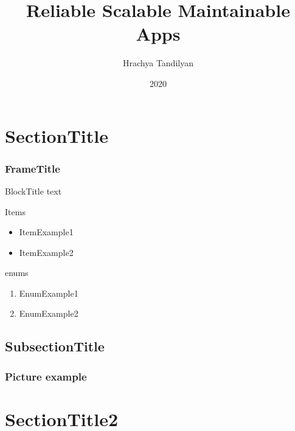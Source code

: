 \documentclass{beamer}
\begin{document}
\title[Reliable Scalable Maintainable Apps]{Reliable Scalable Maintainable Apps}
\author[Hrachya Tandilyan\copyright]{Hrachya Tandilyan}
\date{2020}

\begin{frame}
\titlepage
\end{frame}

\section{SectionTitle}
\begin{frame}\frametitle{FrameTitle}
\begin{block}{BlockTitle}
    text
\end{block}
\vfill
Items
\begin{itemize}
    \item ItemExample1
    \item ItemExample2
\end{itemize}
\vfill
enums
\begin{enumerate}
    \item EnumExample1
    \item EnumExample2
\end{enumerate}
\end{frame}

\subsection{SubsectionTitle}
\begin{frame}\frametitle{Picture example}
\end{frame}

\section{SectionTitle2}
\end{document}
